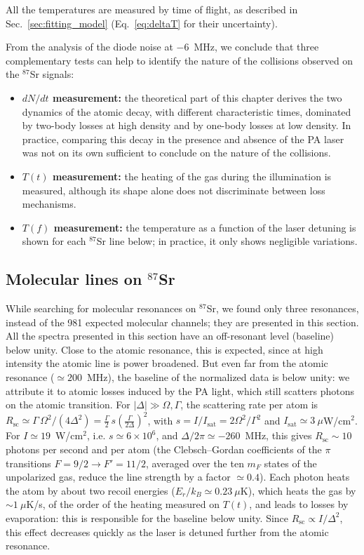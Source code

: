 All the temperatures are measured by time of flight, as described in Sec.~\ref{sec:fitting_model}
(Eq.~\ref{eq:deltaT} for their uncertainty).

From the analysis of the diode noise at $-6$~MHz, we conclude that three
complementary tests can help to identify the nature of
the collisions observed on the $^{87}$Sr signals:
\begin{itemize}
    \item \textbf{$dN/dt$ measurement:} the theoretical part of this chapter derives the
    two dynamics of the atomic decay, with different characteristic times, dominated by
    two-body losses at high density and by one-body losses at low density. In practice, comparing this decay in
    the presence and absence of the PA laser was not on its own sufficient to conclude
    on the nature of the collisions.
    \item \textbf{$T(t)$ measurement:} the heating of the gas during the illumination is
    measured, although its shape alone does not discriminate between loss mechanisms.
    \item \textbf{$T(f)$ measurement:} the temperature as a function of the laser detuning
    is shown for each $^{87}$Sr line below; in practice, it only shows negligible variations.
\end{itemize}

\subsection{Molecular lines on $^{87}$Sr}
\label{raie sr87 }
While searching for molecular resonances on $^{87}$Sr, we found only three resonances,
instead of the 981 expected molecular channels; they are presented in this section.
All the spectra presented in this section have an off-resonant level (baseline) below unity.
Close to the atomic resonance, this is expected, since at high intensity the atomic line is
power broadened. But even far from the atomic resonance ($\simeq 200$~MHz), the baseline of the
normalized data is below unity: we attribute it to atomic losses induced by the PA light, which
still scatters photons on the atomic transition. For $|\Delta|\gg\Omega,\Gamma$, the scattering
rate per atom is $R_{\text{sc}}\simeq\Gamma\,\Omega^2/(4\Delta^2)=\frac{\Gamma}{2}\,s\left(\frac{\Gamma}{2\Delta}\right)^2$,
with $s=I/I_{\text{sat}}=2\Omega^2/\Gamma^2$ and $I_{\text{sat}}\simeq3~\mu$W/cm$^2$. For
$I\simeq19$~W/cm$^2$, i.e. $s\simeq6\times10^6$, and $\Delta/2\pi\simeq-260$~MHz, this gives
$R_{\text{sc}}\sim10$ photons per second and per atom (the Clebsch--Gordan coefficients of the $\pi$
transitions $F=9/2\rightarrow F'=11/2$, averaged over the ten $m_F$ states of the unpolarized gas,
reduce the line strength by a factor $\simeq0.4$). Each photon heats the atom by about two recoil energies
($E_r/k_B\simeq0.23~\mu$K), which heats the gas by $\sim1~\mu$K/s, of the order of the heating
measured on $T(t)$, and leads to losses by evaporation: this is responsible for the baseline below
unity. Since $R_{\text{sc}}\propto I/\Delta^2$, this effect decreases quickly as the laser is
detuned further from the atomic resonance.

